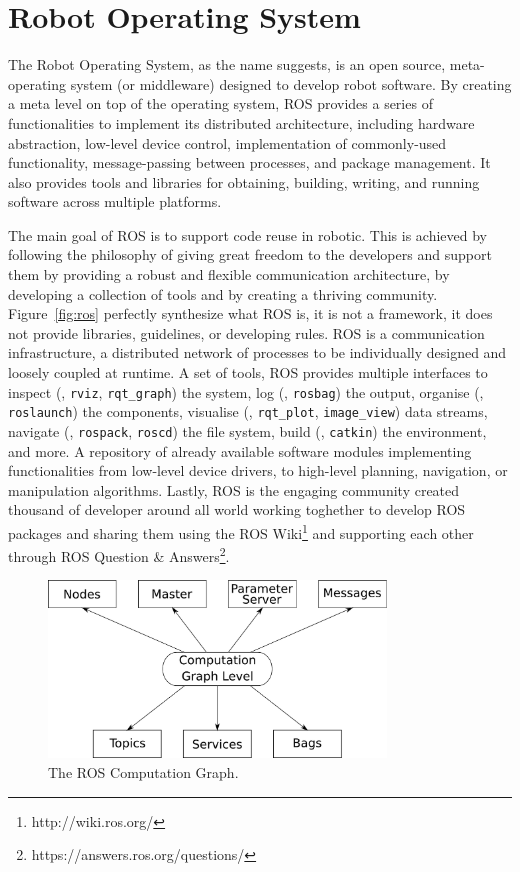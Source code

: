 \section{Robot Operating System}
\label{sec:ros}
The Robot Operating System, as the name suggests, is an open source, meta-operating system (or middleware) designed to develop robot software. By creating a meta level on top of the operating system, ROS provides a series of functionalities to implement its distributed architecture, including  hardware abstraction, low-level device control, implementation of commonly-used functionality, message-passing between processes, and package management. It also provides tools and libraries for obtaining, building, writing, and running software across multiple platforms.

The main goal of ROS is to support code reuse in robotic. This is achieved by following the philosophy of giving great freedom to the developers and support them by providing a robust and flexible communication architecture, by developing a collection of tools and by creating a thriving community. Figure~\ref{fig:ros} perfectly synthesize what ROS is, it is not a framework, it does not provide libraries, guidelines, or developing rules. ROS is a communication infrastructure, a distributed network of processes to be individually designed and loosely coupled at runtime. A set of tools, ROS provides multiple interfaces to inspect (\eg, \texttt{rviz}, \texttt{rqt\_graph}) the system, log (\eg, \texttt{rosbag}) the output, organise (\eg, \texttt{roslaunch}) the components, visualise (\eg, \texttt{rqt\_plot}, \texttt{image\_view}) data streams, navigate (\eg, \texttt{rospack}, \texttt{roscd}) the file system, build (\eg, \texttt{catkin}) the environment, and more. A repository of already available software modules implementing functionalities from low-level device drivers, to high-level planning, navigation, or manipulation algorithms. Lastly, ROS is the engaging community created thousand of developer around all world working toghether to develop ROS packages and sharing them using the ROS Wiki\footnote{http://wiki.ros.org/} and supporting each other through ROS Question \& Answers\footnote{https://answers.ros.org/questions/}.

\begin{figure}[t]
    \centering
    \includegraphics[width=0.8\textwidth]{gfx/ros/graph}
    \caption{The ROS Computation Graph.}\label{fig:ros-graph}
\end{figure}

